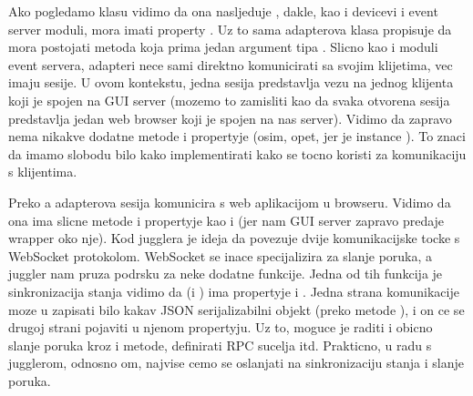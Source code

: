 \documentclass[letterpaper,10pt,croatian]{sphinxmanual}
\begin{document}
\sphinxAtStartPar
Ako pogledamo klasu  vidimo da ona nasljeduje
, dakle, kao i devicevi i event server moduli, mora imati
property . Uz to sama adapterova klasa propisuje da mora
postojati metoda  koja prima jedan argument tipa
.
Slicno kao i moduli event servera, adapteri nece sami direktno komunicirati sa
svojim klijetima, vec imaju sesije. U ovom kontekstu, jedna sesija predstavlja
vezu na jednog klijenta koji je spojen na GUI server (mozemo to zamisliti kao
da svaka otvorena sesija predstavlja jedan web browser koji je spojen na nas
server). Vidimo da 
zapravo nema nikakve dodatne metode i propertyje (osim, opet, 
jer je instance ). To znaci da imamo slobodu bilo kako
implementirati kako se tocno koristi  za komunikaciju s
klijentima.

\sphinxAtStartPar
Preko \sphinxhyphen{}a adapterova sesija komunicira s web aplikacijom
u browseru. Vidimo da ona ima slicne metode i propertyje kao i  (jer nam GUI server
zapravo predaje wrapper oko nje). Kod jugglera je ideja da povezuje dvije
komunikacijske tocke s WebSocket protokolom. WebSocket se inace specijalizira
za slanje poruka, a juggler nam pruza podrsku za neke dodatne funkcije. Jedna
od tih funkcija je sinkronizacija stanja \sphinxhyphen{} vidimo da  (i
) ima propertyje  i .
Jedna strana komunikacije moze u  zapisati bilo kakav JSON
serijalizabilni objekt (preko metode ), i on ce se drugoj
strani pojaviti u njenom  propertyju. Uz to, moguce je raditi i
obicno slanje poruka kroz  i  metode, definirati RPC sucelja
itd. Prakticno, u radu s jugglerom, odnosno \sphinxhyphen{}om,
najvise cemo se oslanjati na sinkronizaciju stanja i slanje poruka.
\end{document}
